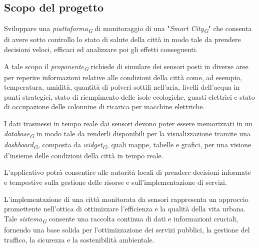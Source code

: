 \subsection{Scopo del progetto}
Sviluppare una \textit{piattaforma}\textsubscript{\textit{G}} di monitoraggio di una "\textit{Smart City}\textsubscript{\textit{G}}" che consenta di avere sotto controllo lo stato di salute della città in modo tale da prendere decisioni veloci, efficaci ed analizzare poi gli effetti conseguenti.

A tale scopo il \textit{proponente}\textsubscript{\textit{G}} richiede di simulare dei sensori posti in diverse aree per reperire informazioni relative alle condizioni della città come, ad esempio, temperatura, umidità, quantità di polveri sottili nell’aria, livelli dell'acqua in punti strategici, stato di riempimento delle isole ecologiche, guasti elettrici e stato di occupazione delle colonnine di ricarica per macchine elettriche.

I dati trasmessi in tempo reale dai sensori devono poter essere memorizzati in un \textit{database}\textsubscript{\textit{G}} in modo tale da renderli disponibili per la visualizzazione tramite una \textit{dashboard}\textsubscript{\textit{G}}, composta da \textit{widget}\textsubscript{\textit{G}}, quali mappe, tabelle e grafici, per una visione d’insieme delle condizioni della città in tempo reale.

L’applicativo potrà consentire alle autorità locali di prendere decisioni informate e tempestive sulla gestione delle risorse e sull’implementazione di servizi.

L’implementazione di una città monitorata da sensori rappresenta un approccio promettente nell’ottica di ottimizzare l’efficienza e la qualità della vita urbana. Tale \textit{sistema}\textsubscript{\textit{G}} consente una raccolta continua di dati e informazioni cruciali, fornendo una base solida per l’ottimizzazione
dei servizi pubblici, la gestione del traffico, la sicurezza e la sostenibilità ambientale.

